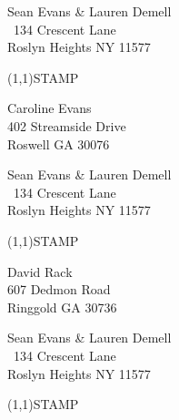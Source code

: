 \documentclass[12pt]{article}
\begin{document}
\begin{minipage}{.5\linewidth} \noindent
Sean Evans \& Lauren Demell\\\ 
134 Crescent Lane\\ 
Roslyn Heights NY 11577
\end{minipage}
\begin{minipage}{.5\linewidth \hspace{-.2in} \vspace{-.3in}}
\begin{flushright}
\framebox(1,1){STAMP}
\end{flushright}
\end{minipage}

\begin{center} \begin{Huge} \vspace*{\fill}
Caroline Evans\\
402 Streamside Drive\\
Roswell GA 30076\\
\vspace{\fill} \end{Huge} \end{center}

\clearpage

\begin{minipage}{.5\linewidth} \noindent
Sean Evans \& Lauren Demell\\\ 
134 Crescent Lane\\ 
Roslyn Heights NY 11577
\end{minipage}
\begin{minipage}{.5\linewidth \hspace{-.2in} \vspace{-.3in}}
\begin{flushright}
\framebox(1,1){STAMP}
\end{flushright}
\end{minipage}

\begin{center} \begin{Huge} \vspace*{\fill}
David Rack\\
607 Dedmon Road\\
Ringgold GA 30736\\
\vspace{\fill} \end{Huge} \end{center}

\clearpage

\begin{minipage}{.5\linewidth} \noindent
Sean Evans \& Lauren Demell\\\ 
134 Crescent Lane\\ 
Roslyn Heights NY 11577
\end{minipage}
\begin{minipage}{.5\linewidth \hspace{-.2in} \vspace{-.3in}}
\begin{flushright}
\framebox(1,1){STAMP}
\end{flushright}
\end{minipage}
\end{document}
